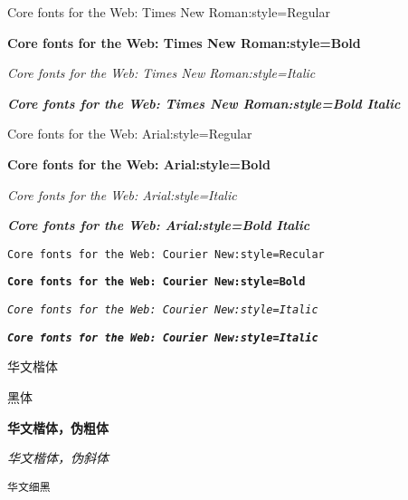 \documentclass[20pt]{article}
\begin{document}
Core fonts for the Web: Times New Roman:style=Regular

\textbf{Core fonts for the Web: Times New Roman:style=Bold}

\textit{Core fonts for the Web: Times New Roman:style=Italic}

\textbf{\textit{Core fonts for the Web: Times New Roman:style=Bold Italic}}

\textsf{Core fonts for the Web: Arial:style=Regular}

\textbf{\textsf{Core fonts for the Web: Arial:style=Bold}}

\textit{\textsf{Core fonts for the Web: Arial:style=Italic}}

\textbf{\textit{\textsf{Core fonts for the Web: Arial:style=Bold Italic}}}

\texttt{Core fonts for the Web: Courier New:style=Recular}

\textbf{\texttt{Core fonts for the Web: Courier New:style=Bold}}

\textit{\texttt{Core fonts for the Web: Courier New:style=Italic}}

\textbf{\textit{\texttt{Core fonts for the Web: Courier New:style=Italic}}}

华文楷体

\textsf{黑体}

\textbf{华文楷体，伪粗体}

\textit{华文楷体，伪斜体}

\texttt{华文细黑}
\end{document}

